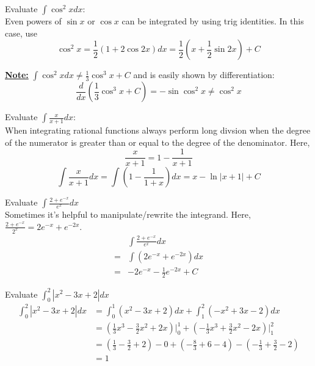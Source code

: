 \documentclass[11pt]{article}
\theoremstyle{plain}
\theoremstyle{remark}
\theoremstyle{plain}
\newcommand{\bd}{\textbf}
\begin{document}
\begin{tcolorbox}[colback=magenta!5!white,colframe=magenta!75!black,title=Problem 2 ]
    Evaluate $\int\cos^2xdx$:\\

    Even powers of $\sin x$ or $\cos x$ can be integrated by using trig identities. In this case, use \[\cos^2x = \frac{1}{2}(1+2\cos 2x)dx = \frac{1}{2}(x+\frac{1}{2}\sin 2x)+C\]

    \bd{\underline{Note:}} $\int\cos^2xdx \neq \frac{1}{3}\cos^3x+C$ and is easily shown by differentiation:
    \[\frac{d}{dx}(\frac{1}{3}\cos^3x+C) = -\sin\cos^2x \neq \cos^2x\]
\end{tcolorbox}   

\begin{tcolorbox}[colback=magenta!5!white,colframe=magenta!75!black,title=Problem 3 ]
    Evaluate $\int\frac{x}{x+1}dx$:\\

    When integrating rational functions always perform long divsion when the degree of the numerator is greater than 
    or equal to the degree of the denominator. Here, \[\frac{x}{x+1} = 1-\frac{1}{x+1}\]\[\int\frac{x}{x+1}dx = \int(1-\frac{1}{1+x})dx=x-\ln|x+1|+C\]
\end{tcolorbox}   

\begin{tcolorbox}[colback=magenta!5!white,colframe=magenta!75!black,title=Problem 4]
    Evaluate $\int\frac{2+e^{-x}}{e^x}dx$ \\

    Sometimes it's helpful to manipulate/rewrite the integrand. Here, $\frac{2+e^{-x}}{2^x} = 2e^{-x} + e^{-2x}$.
    \begin{align*}
        &\int\frac{2+e^{-x}}{e^x}dx \\ 
        =&\int(2e^{-x}+e^{-2x})dx  \\
        =&-2e^{-x}-\frac{1}{2}e^{-2x}+C 
    \end{align*}
\end{tcolorbox}   

\begin{tcolorbox}[colback=magenta!5!white,colframe=magenta!75!black,title=Problem 5]
    Evaluate $\int_0^2|x^2-3x+2|dx$\\

    \begin{align*}
        \int_0^2|x^2-3x+2|dx &=\int_0^1(x^2-3x+2)dx+\int_1^2(-x^2+3x-2)dx \\
        &=(\frac{1}{3}x^3-\frac{3}{2}x^2+2x)\Big|_0^1+(-\frac{1}{3}x^3+\frac{3}{2}x^2-2x)\Big|_1^2 \\
        &=(\frac{1}{3}-\frac{3}{2}+2)-0+(-\frac{8}{3}+6-4)-(-\frac{1}{3}+\frac{3}{2}-2) \\
        &= 1
    \end{align*}
\end{tcolorbox}   
\end{document}
